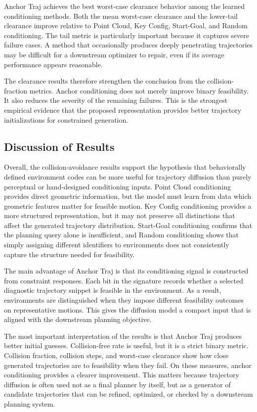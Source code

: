 Anchor Traj achieves the best worst-case clearance behavior among the learned conditioning methods. Both the mean worst-case clearance and the lower-tail clearance improve relative to Point Cloud, Key Config, Start-Goal, and Random conditioning. The tail metric is particularly important because it captures severe failure cases. A method that occasionally produces deeply penetrating trajectories may be difficult for a downstream optimizer to repair, even if its average performance appears reasonable.

The clearance results therefore strengthen the conclusion from the collision-fraction metrics. Anchor conditioning does not merely improve binary feasibility. It also reduces the severity of the remaining failures. This is the strongest empirical evidence that the proposed representation provides better trajectory initializations for constrained generation.

\subsection{Discussion of Results}

Overall, the collision-avoidance results support the hypothesis that behaviorally defined environment codes can be more useful for trajectory diffusion than purely perceptual or hand-designed conditioning inputs. Point Cloud conditioning provides direct geometric information, but the model must learn from data which geometric features matter for feasible motion. Key Config conditioning provides a more structured representation, but it may not preserve all distinctions that affect the generated trajectory distribution. Start-Goal conditioning confirms that the planning query alone is insufficient, and Random conditioning shows that simply assigning different identifiers to environments does not consistently capture the structure needed for feasibility.

The main advantage of Anchor Traj is that its conditioning signal is constructed from constraint responses. Each bit in the signature records whether a selected diagnostic trajectory snippet is feasible in the environment. As a result, environments are distinguished when they impose different feasibility outcomes on representative motions. This gives the diffusion model a compact input that is aligned with the downstream planning objective.

The most important interpretation of the results is that Anchor Traj produces better initial guesses. Collision-free rate is useful, but it is a strict binary metric. Collision fraction, collision steps, and worst-case clearance show how close generated trajectories are to feasibility when they fail. On these measures, anchor conditioning provides a clearer improvement. This matters because trajectory diffusion is often used not as a final planner by itself, but as a generator of candidate trajectories that can be refined, optimized, or checked by a downstream planning system.

